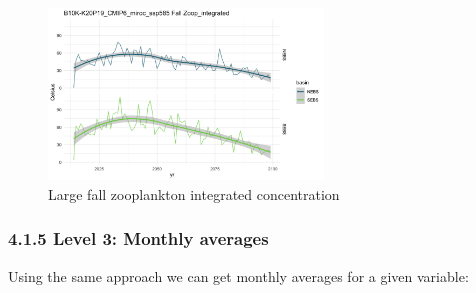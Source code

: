 \documentclass[
]{article}
\begin{document}
\begin{figure}
\centering
\includegraphics[width=0.65\textwidth,height=\textheight]{Figs/Fall_large_Zoop.jpg}
\caption{Large fall zooplankton integrated concentration}
\end{figure}

\hypertarget{level-3-monthly-averages}{%
\subsubsection{4.1.5 Level 3: Monthly
averages}\label{level-3-monthly-averages}}

Using the same approach we can get monthly averages for a given
variable:
\end{document}
